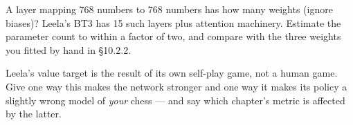 \begin{exercises}
 A layer mapping 768 numbers to 768 numbers has how
many weights (ignore biases)? Leela's BT3 has 15 such layers plus attention machinery.
Estimate the parameter count to within a factor of two, and compare with the three weights
you fitted by hand in §10.2.2.

 Leela's value target is the result of its own
self-play game, not a human game. Give one way this makes the network stronger and one way it
makes its policy a slightly wrong model of \emph{your} chess --- and say which chapter's
metric is affected by the latter.

\end{exercises}
